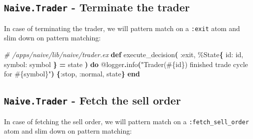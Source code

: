 \documentclass[
  oneside]{book}
\newenvironment{Shaded}{\begin{snugshade}}{\end{snugshade}}
\newcommand{\CommentTok}[1]{\textcolor[rgb]{0.56,0.35,0.01}{\textit{#1}}}
\newcommand{\ConstantTok}[1]{\textcolor[rgb]{0.56,0.35,0.01}{#1}}
\newcommand{\FunctionTok}[1]{\textcolor[rgb]{0.13,0.29,0.53}{\textbf{#1}}}
\newcommand{\KeywordTok}[1]{\textcolor[rgb]{0.13,0.29,0.53}{\textbf{#1}}}
\newcommand{\NormalTok}[1]{#1}
\newcommand{\OperatorTok}[1]{\textcolor[rgb]{0.81,0.36,0.00}{\textbf{#1}}}
\newcommand{\OtherTok}[1]{\textcolor[rgb]{0.56,0.35,0.01}{#1}}
\newcommand{\StringTok}[1]{\textcolor[rgb]{0.31,0.60,0.02}{#1}}
\newcommand{\VariableTok}[1]{\textcolor[rgb]{0.00,0.00,0.00}{#1}}
\begin{document}
\subsection{\texorpdfstring{\texttt{Naive.Trader} - Terminate the trader}{Naive.Trader - Terminate the trader}}\label{naive.trader---terminate-the-trader}

In case of terminating the trader, we will pattern match on a \texttt{:exit} atom and slim down on pattern matching:

\begin{Shaded}
\begin{Highlighting}[]
\CommentTok{\# /apps/naive/lib/naive/trader.ex}
  \KeywordTok{def}\NormalTok{ execute\_decision}\FunctionTok{(}
         \VariableTok{:exit}\NormalTok{,}
\NormalTok{         \%}\ConstantTok{State}\FunctionTok{\{}
           \VariableTok{id:}\NormalTok{ id,}
           \VariableTok{symbol:}\NormalTok{ symbol}
         \FunctionTok{\}} \OperatorTok{=}\NormalTok{ state}
       \FunctionTok{)} \KeywordTok{do}
    \OtherTok{@logger}\OperatorTok{.}\NormalTok{info}\FunctionTok{(}\StringTok{"Trader(}\OtherTok{\#\{}\NormalTok{id}\OtherTok{\}}\StringTok{) finished trade cycle for }\OtherTok{\#\{}\NormalTok{symbol}\OtherTok{\}}\StringTok{"}\FunctionTok{)}
    \FunctionTok{\{}\VariableTok{:stop}\NormalTok{, }\VariableTok{:normal}\NormalTok{, state}\FunctionTok{\}}
  \KeywordTok{end}
\end{Highlighting}
\end{Shaded}

\newpage

\subsection{\texorpdfstring{\texttt{Naive.Trader} - Fetch the sell order}{Naive.Trader - Fetch the sell order}}\label{naive.trader---fetch-the-sell-order}

In case of fetching the sell order, we will pattern match on a \texttt{:fetch\_sell\_order} atom and slim down on pattern matching:
\end{document}
